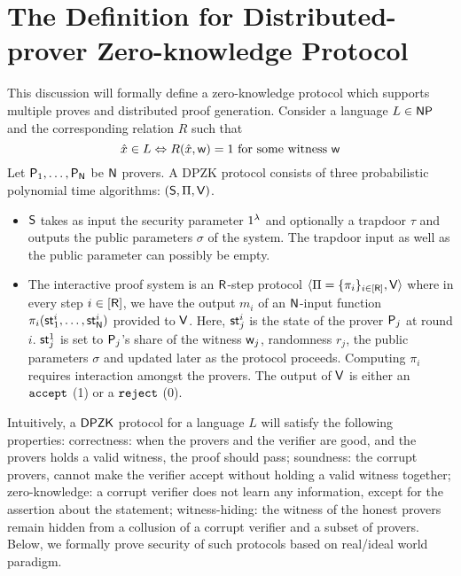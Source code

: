\section{The Definition for Distributed-prover Zero-knowledge Protocol}\label{sec:security model}
This discussion will formally define a zero-knowledge protocol which supports multiple proves and distributed proof generation. Consider a language $L \in \mathsf{NP}$ and the corresponding relation $R$ such that
\[
\hat{x} \in L \Leftrightarrow R(\hat{x}, \mathsf{w})=1 \text{ for some witness } \mathsf{w}
\]
Let $\mathsf{P}_1, \ldots, \mathsf{P}_{\mathsf{N}}$ be $\mathsf{N}$ provers. %
A DPZK protocol consists of three probabilistic polynomial time algorithms: $(\mathsf{S}, \Pi, \mathsf{V})$. 
\begin{itemize}
\item $\mathsf{S}$ takes as input the security parameter $1^{\lambda}$ and optionally a trapdoor $\tau$ and outputs the public parameters $\sigma$ of the system. The trapdoor input as well as the public parameter can possibly be empty.
\item The interactive proof system is an $\mathsf{R}$-step protocol $\langle \Pi = \{\pi_i\}_{i \in [\mathsf{R}]}, \mathsf{V} \rangle$ where in every step $i \in [\mathsf{R}]$, we have the output $m_i$ of an $\mathsf{N}$-input function $\pi_i(\mathsf{st}^i_1, \ldots, \mathsf{st}^i_{\mathsf{N}})$ provided to $\mathsf{V}$.   Here, $\mathsf{st}^i_j$ is the state of the prover $\mathsf{P}_j$ at round $i$. $\mathsf{st}^1_j$ is set to $\mathsf{P}_j$'s share of the witness $\mathsf{w}_j$, randomness $r_j$, the public parameters $\sigma$ and updated later as the protocol proceeds.  Computing $\pi_i$ requires interaction amongst the provers. The output of $\mathsf{V}$ is either an $\tt accept$ (1) or a $\tt{reject}$ (0).%
\end{itemize}
Intuitively, a $\mathsf{DPZK}$ protocol for a language $L$ will satisfy the following properties:  correctness:  when the provers and the verifier are good, and  the provers holds a valid witness, the proof should pass; soundness:  the corrupt provers, cannot make the verifier accept without holding a valid witness together; zero-knowledge: a corrupt verifier does not learn any information, except for the assertion about the statement;  witness-hiding: the witness of the honest provers remain hidden from a collusion of a corrupt verifier and a subset of provers. Below, we formally prove security of such protocols based on real/ideal world paradigm. 

